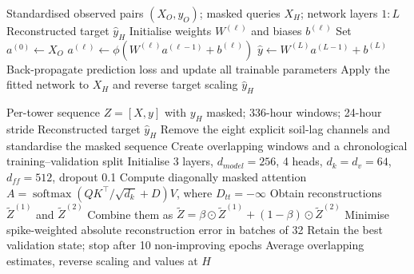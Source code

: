 \begin{algorithm}[H]
\caption{Feed-forward ANN gap reconstruction}
\label{alg:app-ann}
\small
\begin{algorithmic}[1]
\Require Standardised observed pairs $(X_O,y_O)$; masked queries $X_H$;
network layers $1{:}L$
\Ensure Reconstructed target $\hat y_H$
\State Initialise weights $W^{(\ell)}$ and biases $b^{(\ell)}$
    \State Set $a^{(0)}\gets X_O$
        \State $a^{(\ell)}\gets\phi(W^{(\ell)}a^{(\ell-1)}+b^{(\ell)})$
    \EndFor
    \State $\hat y\gets W^{(L)}a^{(L-1)}+b^{(L)}$
    \State Back-propagate prediction loss and update all trainable parameters
\EndFor
\State Apply the fitted network to $X_H$ and reverse target scaling
\State \Return $\hat y_H$
\end{algorithmic}
\end{algorithm}

\begin{algorithm}[H]
\caption{SAITS diagonally masked attention reconstruction}
\label{alg:app-saits}
\small
\begin{algorithmic}[1]
\Require Per-tower sequence $Z=[X,y]$ with $y_H$ masked; 336-hour windows;
24-hour stride
\Ensure Reconstructed target $\hat y_H$
\State Remove the eight explicit soil-lag channels and standardise the masked sequence
\State Create overlapping windows and a chronological training--validation split
\State Initialise 3 layers, $d_{model}=256$, 4 heads, $d_k=d_v=64$,
$d_{ff}=512$, dropout 0.1
    \State Compute diagonally masked attention
    $A=\operatorname{softmax}(QK^\top/\sqrt{d_k}+D)V$, where $D_{tt}=-\infty$
    \State Obtain reconstructions $\widetilde Z^{(1)}$ and $\widetilde Z^{(2)}$
    \State Combine them as
    $\widetilde Z=\beta\odot\widetilde Z^{(1)}+(1-\beta)\odot\widetilde Z^{(2)}$
    \State Minimise spike-weighted absolute reconstruction error in batches of 32
    \State Retain the best validation state; stop after 10 non-improving epochs
\EndFor
\State Average overlapping estimates, reverse scaling and \Return values at $H$
\end{algorithmic}
\end{algorithm}

